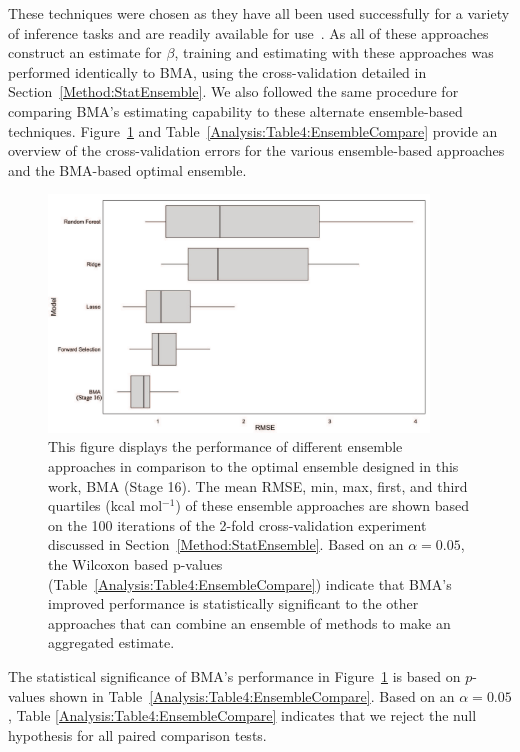 \documentclass[journal=jpcbfk, manuscript=article]{achemso}
\newcommand{\+}[1]{\ensuremath{\mathbf{#1}}}
\begin{document}
These techniques were chosen as they have all been used successfully for a variety of inference tasks and are readily available for use~\cite{R:2008,sklearn_api:2013}.
As all of these approaches construct an estimate for $\beta$, training and estimating with these approaches was performed identically to BMA, using the cross-validation detailed in Section~\ref{Method:StatEnsemble}.
We also followed the same procedure for comparing BMA's estimating capability to these alternate ensemble-based techniques.
Figure~\ref{Analysis:Figure6:Models} and Table~\ref{Analysis:Table4:EnsembleCompare} provide an overview of the cross-validation errors for the various ensemble-based approaches and the BMA-based optimal ensemble.
\begin{figure}
	\centering
	\includegraphics[keepaspectratio,width=0.9\textwidth]{Figures/BMA_Xval_baselineModels_RMSE}
	\caption{This figure displays the performance of different ensemble approaches in comparison to the optimal ensemble designed in this work, BMA (Stage 16).
	The mean RMSE, min, max, first, and third quartiles (kcal mol$^{-1}$) of these ensemble approaches are shown based on the 100 iterations of the 2-fold cross-validation experiment discussed in Section~\ref{Method:StatEnsemble}.
	Based on an $\alpha = 0.05$, the Wilcoxon based p-values (Table~\ref{Analysis:Table4:EnsembleCompare}) indicate that BMA's improved performance is statistically significant to the other approaches that can combine an ensemble of methods to make an aggregated estimate.}
	\label{Analysis:Figure6:Models}
\end{figure}
The statistical significance of BMA's performance in Figure~\ref{Analysis:Figure6:Models} is based on $p$-values shown in Table~\ref{Analysis:Table4:EnsembleCompare}. Based on an $\alpha = 0.05$, Table \ref{Analysis:Table4:EnsembleCompare} indicates that we reject the null hypothesis for all paired comparison tests.
\end{document}
